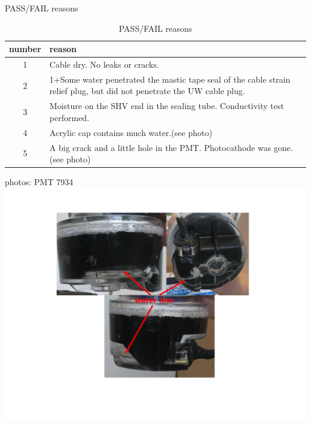\documentclass{beamer}
\begin{document}
\begin{frame}{PASS/FAIL reasons}
	\setlength{\tabcolsep}{2pt}
	\small
	\begin{table}
		\begin{tabular}{|c|p{3.5in}|}
		\hline
		\textbf{number} & \textbf{reason} \\
		\hline
		\hline
		1 & Cable dry. No leaks or cracks. \\
		\hline
		2 & 1+Some water penetrated the mastic tape seal of the cable strain relief plug,
			but did not penetrate the UW cable plug. \\
		\hline
		3 & Moisture on the SHV end in the sealing tube. Conductivity test performed. \\
		\hline
		4 & Acrylic cap contains much water.(see photo) \\
		\hline
		5 & A big crack and a little hole in the PMT. Photocathode was gone.(see photo) \\
		\hline
		\end{tabular}
	\caption{PASS/FAIL reasons}
	\end{table}
\end{frame}

\begin{frame}{photos: PMT 7934}
\includegraphics[width=20cm]{PMT7934.jpg}
\end{frame}
\end{document}
